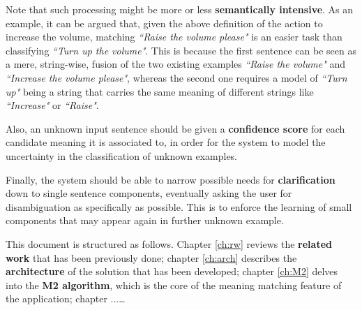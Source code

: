 Note that such processing might be more or less \textbf{semantically intensive}. As an example, it can be argued that, given the above definition of the action to increase the volume, matching \textit{``Raise the volume please"} is an easier task than classifying \textit{``Turn up the volume"}. This is because the first sentence can be seen as a mere, string-wise, fusion of the two existing examples \textit{``Raise the volume"} and \textit{``Increase the volume please"}, whereas the second one requires a model of \textit{``Turn up"} being a string that carries the same meaning of different strings like \textit{``Increase"} or \textit{``Raise"}.

Also, an unknown input sentence should be given a \textbf{confidence score} for each candidate meaning it is associated to, in order for the system to model the uncertainty in the classification of unknown examples.

Finally, the system should be able to narrow possible needs for \textbf{clarification} down to single sentence components, eventually asking the user for disambiguation as specifically as possible. This is to enforce the learning of small components that may appear again in further unknown example.

This document is structured as follows. Chapter \ref{ch:rw} reviews the \textbf{related work} that has been previously done; chapter \ref{ch:arch} describes the \textbf{architecture} of the solution that has been developed; chapter \ref{ch:M2} delves into the \textbf{M2 algorithm}, which is the core of the meaning matching feature of the application; chapter ...\ldots
